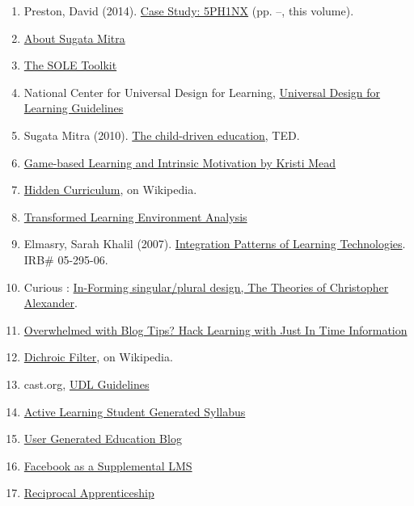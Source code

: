 \begin{enumerate}
\item
  Preston, David (2014). \href{http://peeragogy.org/case-study-5ph1nx/}{Case Study:
  5PH1NX} (pp. \pageref{sphinx-beginning}--\pageref{sphinx-end}, this volume).
\item
  \href{http://sugatam.wikispaces.com/}{About Sugata Mitra}
\item
  \href{http://www.ted.com/pages/sole\_toolkit}{The SOLE Toolkit}
\item National Center for Universal Design for Learning,
  \href{http://www.udlcenter.org/aboutudl/udlguidelines}{Universal Design for
  Learning Guidelines}
\item Sugata Mitra (2010).
  \href{http://www.ted.com/talks/sugata\_mitra\_the\_child\_driven\_education.html}{The child-driven education}, TED.
\item
  \href{http://www.academia.edu/1137269/Game-based\_Learning\_and\_Intrinsic\_Motivation}{Game-based
  Learning and Intrinsic Motivation by Kristi Mead}
\item
  \href{http://en.wikipedia.org/wiki/Hidden\_curriculum}{Hidden Curriculum}, on Wikipedia.
\item
  \href{http://www.scribd.com/doc/181089012/Transformed-Learning-Environment-Analysis}{Transformed
  Learning Environment Analysis}
\item
  Elmasry, Sarah Khalil (2007).
  \href{http://scholar.lib.vt.edu/theses/available/etd-09232007-220306/unrestricted/SElmasryETDbodytext.pdf}{Integration
  Patterns of Learning Technologies}. IRB\# 05-295-06.
\item
  Curious :
  \href{http://nourdiab.wordpress.com/2011/02/23/the-theories-of-christopher-alexander/}{In-Forming
  singular/plural design, The Theories of Christopher Alexander}.
\item
  \href{http://www.wordstream.com/blog/ws/2013/10/02/just-in-time-information-hacks}{Overwhelmed
  with Blog Tips? Hack Learning with Just In Time Information}
\item
  \href{http://en.wikipedia.org/wiki/Dichroic\_filter}{Dichroic Filter}, on Wikipedia.
\item cast.org, \href{http://www.cast.org/library/UDLguidelines/}{UDL Guidelines}
\item
  \href{http://www.theatreprof.com/2011/active-learning-student-generated-syllabus/}{Active
  Learning Student Generated Syllabus}
\item
  \href{http://usergeneratededucation.wordpress.com/}{User Generated
  Education Blog}
\item
  \href{http://community.telecentre.org/profiles/blogs/facebook-as-a-supplemental-lms}{Facebook
  as a Supplemental LMS}
\item
  \href{http://starwars.wikia.com/wiki/Reciprocal\_apprenticeship}{Reciprocal
  Apprenticeship}
\end{enumerate}
